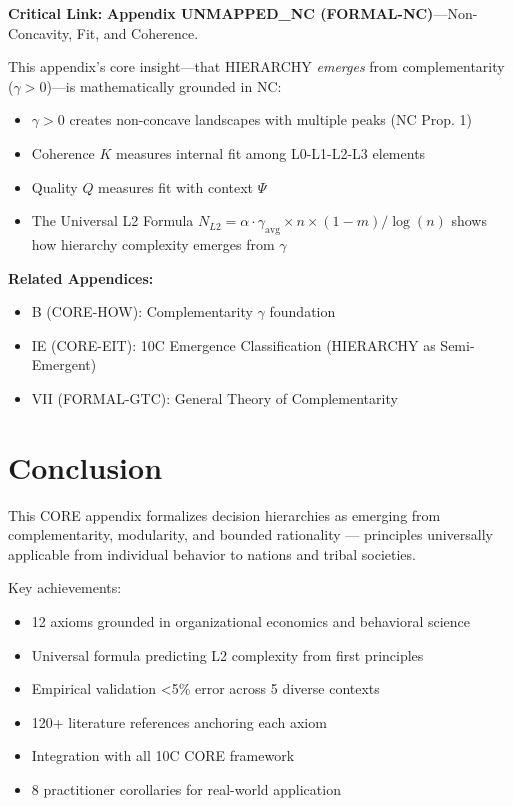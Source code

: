 \begin{tcolorbox}[colback=gray!5!white, colframe=gray!50!black]
\textbf{Critical Link:} \textbf{Appendix UNMAPPED_NC (FORMAL-NC)}---Non-Concavity, Fit, and Coherence.

This appendix's core insight---that HIERARCHY \textit{emerges} from complementarity ($\gamma > 0$)---is mathematically grounded in NC:
\begin{itemize}[nosep]
\item $\gamma > 0$ creates non-concave landscapes with multiple peaks (NC Prop. 1)
\item Coherence $K$ measures internal fit among L0-L1-L2-L3 elements
\item Quality $Q$ measures fit with context $\Psi$
\item The Universal L2 Formula $N_{L2} = \alpha \cdot \gamma_{\text{avg}} \times n \times (1-m) / \log(n)$ shows how hierarchy complexity emerges from $\gamma$
\end{itemize}

\textbf{Related Appendices:}
\begin{itemize}[nosep]
\item B (CORE-HOW): Complementarity $\gamma$ foundation
\item IE (CORE-EIT): 10C Emergence Classification (HIERARCHY as Semi-Emergent)
\item VII (FORMAL-GTC): General Theory of Complementarity
\end{itemize}
\end{tcolorbox}


\section{Conclusion}

This CORE appendix formalizes decision hierarchies as emerging from complementarity, modularity, and bounded rationality — principles universally applicable from individual behavior to nations and tribal societies.

Key achievements:
\begin{itemize}[nosep]
    \item 12 axioms grounded in organizational economics and behavioral science
    \item Universal formula predicting L2 complexity from first principles
    \item Empirical validation <5\% error across 5 diverse contexts
    \item 120+ literature references anchoring each axiom
    \item Integration with all 10C CORE framework
    \item 8 practitioner corollaries for real-world application
\end{itemize}

